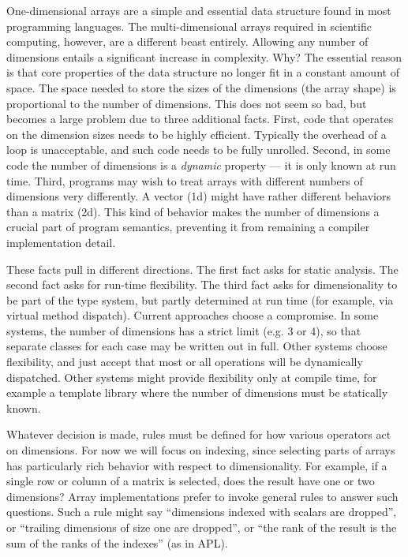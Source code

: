 One-dimensional arrays are a simple and essential data structure found in
most programming languages. The multi-dimensional arrays required in
scientific computing, however, are a different beast entirely. Allowing
any number of dimensions entails a significant increase in complexity. Why?
The essential reason is that core properties of the data structure no
longer fit in a constant amount of space. The space needed to store the
sizes of the dimensions (the array shape) is proportional to the number
of dimensions. This does not seem so bad, but becomes a large problem
due to three additional facts. First, code that operates on the dimension
sizes needs to be highly efficient. Typically the overhead of a loop is
unacceptable, and such code needs to be fully unrolled. Second, in some
code the number of dimensions is a \emph{dynamic} property --- it is
only known at run time. Third, programs may wish to treat arrays with
different numbers of dimensions very differently. A vector (1d) might
have rather different behaviors than a matrix (2d). This kind of
behavior makes the number of dimensions a crucial part of program
semantics, preventing it from remaining a compiler implementation detail.

These facts pull in different directions. The first fact asks for static
analysis. The second fact asks for run-time flexibility. The third fact asks
for dimensionality to be part of the type system, but partly determined
at run time (for example, via virtual method dispatch). Current approaches
choose a compromise. In some systems, the number of dimensions has a strict
limit (e.g. 3 or 4), so that separate classes for each case may be written
out in full. Other systems choose flexibility, and just accept that most
or all operations will be dynamically dispatched. Other systems might
provide flexibility only at compile time, for example a template library
where the number of dimensions must be statically known.



Whatever decision is made, rules must be defined for how various operators
act on dimensions. For now we will focus on indexing, since selecting
parts of arrays has particularly rich behavior with respect to
dimensionality. For example, if a single row or column of a matrix is
selected, does the result have one or two dimensions? Array implementations
prefer to invoke general rules to answer such questions. Such a rule might
say ``dimensions indexed with scalars are dropped'', or ``trailing
dimensions of size one are dropped'', or ``the rank of the result
is the sum of the ranks of the indexes'' (as in APL).

